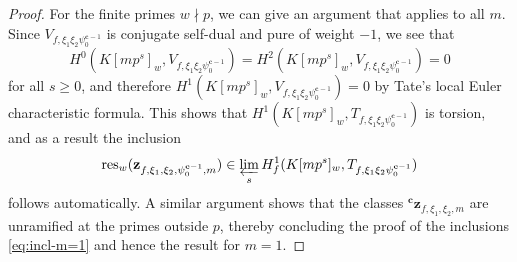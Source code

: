 \documentclass[10pt,letterpaper]{amsart}
\theoremstyle{plain}
\theoremstyle{definition}
\theoremstyle{definition}
\theoremstyle{plain}
\theoremstyle{plain}
\theoremstyle{plain}
\theoremstyle{remark}
\numberwithin{equation}{section}
\newcommand{\cc}{\mathbf{c}}
\begin{document}
\begin{proof}
For the finite  primes $w\nmid p$, we can give an argument that applies to all $m$. Since $V_{f,\xi_1\xi_2\psi_0^{\cc-1}}$ is conjugate self-dual and pure of weight $-1$, we see that 
\[
H^0(K[mp^s]_w,V_{f,\xi_1\xi_2\psi_0^{\cc-1}})=H^2(K[mp^s]_w,V_{f,\xi_1\xi_2\psi_0^{\cc-1}})=0
\]
for all $s\geq 0$, and therefore $H^1(K[mp^s]_w,V_{f,\xi_1\xi_2\psi_0^{\cc-1}})=0$ by Tate's local Euler characteristic formula. This shows that  $H^1(K[mp^s]_w,T_{f,\xi_1\xi_2\psi_0^{\cc-1}})$ is torsion, and as a result the inclusion
\[
{\mathrm{res}}_w(\mathbf{z}_{f,\xi_1,\xi_2,\psi_0^{\cc-1},m})\in \varprojlim_s H^1_f(K[mp^s]_w,T_{f,\xi_1\xi_2\psi_0^{\cc-1}})
\]
follows automatically. A similar argument shows that the classes  ${}^\cc\mathbf{z}_{f,\xi_1,\xi_2,m}$ are unramified at the primes outside $p$, thereby concluding the proof of the inclusions \eqref{eq:incl-m=1} and hence the result for $m=1$. 


\end{proof}
\end{document}
